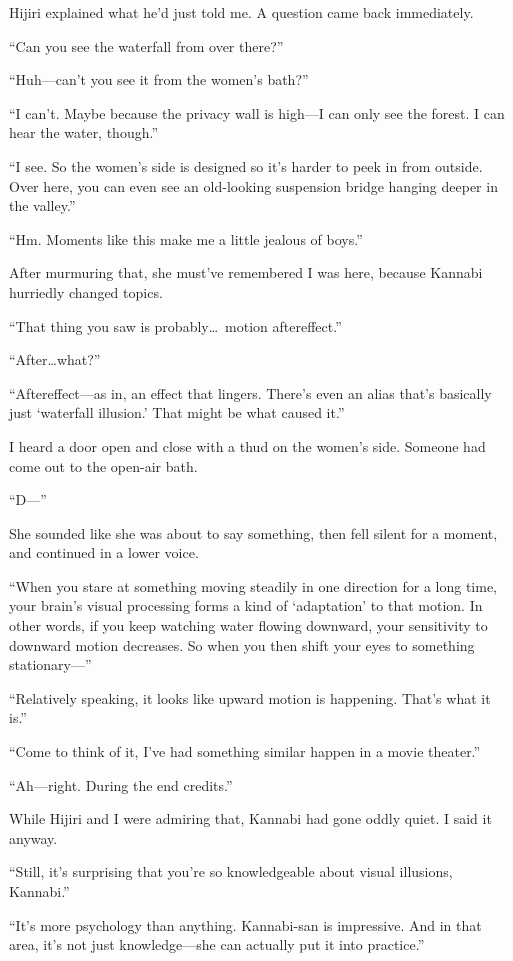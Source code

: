 \documentclass[
    a4paper,
    12pt,
    twoside,
    openany,
    UTF8,
    fontset=windows
]{ctexbook}
\begin{document}
Hijiri explained what he'd just told me. A question came back immediately.

``Can you see the waterfall from over there?''

``Huh---can't you see it from the women's bath?''

``I can't. Maybe because the privacy wall is high---I can only see the forest. I can hear the water, though.''

``I see. So the women's side is designed so it's harder to peek in from outside. Over here, you can even see an old-looking suspension bridge hanging deeper in the valley.''

``Hm. Moments like this make me a little jealous of boys.''

After murmuring that, she must've remembered I was here, because Kannabi hurriedly changed topics.

``That thing you saw is probably\dots\ motion aftereffect.''

``After\dots what?''

``Aftereffect---as in, an effect that lingers. There's even an alias that's basically just `waterfall illusion.' That might be what caused it.''

I heard a door open and close with a thud on the women's side. Someone had come out to the open-air bath.

``D---''

She sounded like she was about to say something, then fell silent for a moment, and continued in a lower voice.

``When you stare at something moving steadily in one direction for a long time, your brain's visual processing forms a kind of `adaptation' to that motion. In other words, if you keep watching water flowing downward, your sensitivity to downward motion decreases. So when you then shift your eyes to something stationary---''

``Relatively speaking, it looks like upward motion is happening. That's what it is.''

``Come to think of it, I've had something similar happen in a movie theater.''

``Ah---right. During the end credits.''

While Hijiri and I were admiring that, Kannabi had gone oddly quiet. I said it anyway.

``Still, it's surprising that you're so knowledgeable about visual illusions, Kannabi.''

``It's more psychology than anything. Kannabi-san is impressive. And in that area, it's not just knowledge---she can actually put it into practice.''
\end{document}
